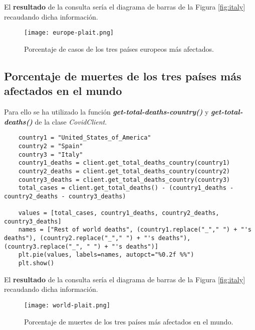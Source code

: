 \documentclass[11pt]{diazessay} %
\begin{document}
El \textbf{resultado} de la consulta sería el diagrama de barras de la Figura \ref{fig:italy} recaudando dicha información.

\begin{figure}[h!]
	\centering
	\texttt{[image: europe-plait.png]}
	\caption{Porcentaje de casos de los tres países europeos más afectados. \cite{matplotlib}}
	\label{fig:europe-plait}
\end{figure}


\subsection*{Porcentaje de muertes de los tres países más afectados en el mundo}
Para ello se ha utilizado la función \textit{\textbf{get-total-deaths-country()}} y \textit{\textbf{get-total-deaths()}} \cite{jupyter} de la clase \textit{CovidClient}.

\lstset{language=Python}
\begin{lstlisting}
	country1 = "United_States_of_America"
	country2 = "Spain"
	country3 = "Italy"
	country1_deaths = client.get_total_deaths_country(country1)
	country2_deaths = client.get_total_deaths_country(country2)
	country3_deaths = client.get_total_deaths_country(country3)
	total_cases = client.get_total_deaths() - (country1_deaths - country2_deaths - country3_deaths)
	
	values = [total_cases, country1_deaths, country2_deaths, country3_deaths]
	names = ["Rest of world deaths", (country1.replace("_"," ") + "'s deaths"), (country2.replace("_"," ") + "'s deaths"), (country3.replace("_", " ") + "'s deaths")]
	plt.pie(values, labels=names, autopct="%0.2f %%")
	plt.show()
\end{lstlisting}

El \textbf{resultado} de la consulta sería el diagrama de barras de la Figura \ref{fig:italy} recaudando dicha información.

\begin{figure}[h!]
	\centering
	\texttt{[image: world-plait.png]}
	\caption{Porcentaje de muertes de los tres países más afectados en el mundo. \cite{matplotlib}}
	\label{fig:world-plait}
\end{figure}

\clearpage
\end{document}
